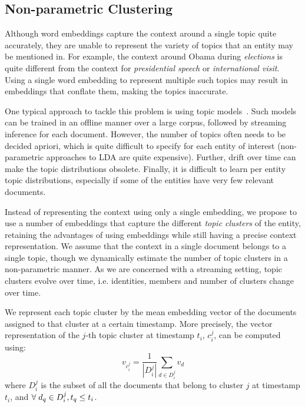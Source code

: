 \documentclass{article}
\begin{document}
\subsection{Non-parametric Clustering}
\label{non}

Although word embeddings capture the context around a single topic quite accurately, they are unable to represent the variety of topics that an entity may be mentioned in.
For example, the context around Obama during \emph{elections} is quite different from the context for \emph{presidential speech} or \emph{international visit}.
Using a single word embedding to represent multiple such topics may result in embeddings that conflate them, making the topics inaccurate.

One typical approach to tackle this problem is using topic models~\cite{blei12}.
Such models can be trained in an offline manner over a large corpus, followed by streaming inference for each document.
However, the number of topics often needs to be decided apriori, which is quite difficult to specify for each entity of interest (non-parametric approaches to LDA are quite expensive).
Further, drift over time can make the topic distributions obsolete.
Finally, it is difficult to learn per entity topic distributions, especially if some of the entities have very few relevant documents.


Instead of representing the context using only a single embedding, we propose to use a number of embeddings that capture the different \emph{topic clusters} of the entity, retaining the advantages of using embeddings while still having a precise context representation.
We assume that the context in a single document belongs to a single topic, though we dynamically estimate the number of topic clusters in a non-parametric manner.
As we are concerned with a streaming setting, topic clusters evolve over time, i.e. identities, members and number of clusters change over time. 

We represent each topic cluster by the mean embedding vector of the documents assigned to that cluster at a certain timestamp.
More precisely, the vector representation of the $j$-th topic cluster at timestamp $t_i$, $c^j_i$, can be computed using: %
\begin{equation}
\label{nonparamclust}
v_{c^j_i} = \frac{1}{|D^j_i|} \sum_{d \in D^j_i}{v_d}
\end{equation}
where $D^j_i$ is the subset of all the documents that belong to cluster $j$ at timestamp $t_i$, and $\forall\hspace{1mm}d_q \in D^j_i, t_q \leq t_i$.
\end{document}
